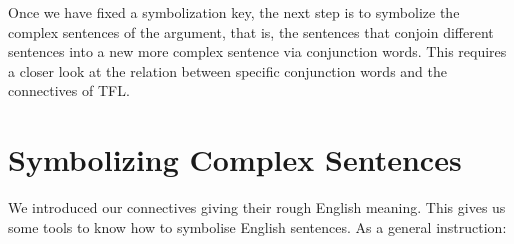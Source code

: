 Once we have fixed a symbolization key, the next step is to symbolize the complex sentences of the argument, that is, the sentences that conjoin different sentences into a new more complex sentence via conjunction words. This requires a closer look at the relation between specific conjunction words and the connectives of TFL.


\section{Symbolizing Complex Sentences}\label{s:SymbolisingComplexTFL}
We introduced our connectives giving their rough English meaning. This gives us some tools to know how to symbolise English sentences. As a general instruction:

